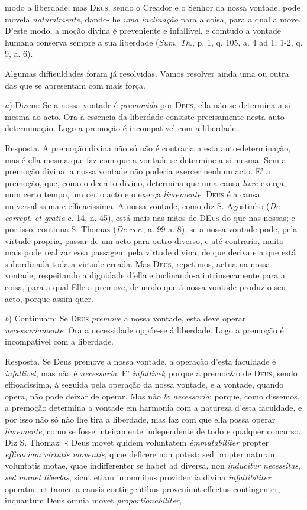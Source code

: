 modo a liberdade; mas \textsc{Deus}, sendo o Creador e o Senhor da nossa vontade, pode movela \emph{naturalmente}, dando-lhe \emph{uma inclinação} para a coisa, para a qual a move. D'este modo, a moção divina é preveniente e infallivel, e comtudo a vontade humana conserva sempre a sua liberdade (\emph{Sum}. \emph{Th}., p. 1, q. 105, a. 4 ad 1; 1-2, q. 9, a. 6).\par Algumas diffieuldades foram já resolvidas. Vamos resolver ainda uma ou outra das que se apresentam com mais força.\par \emph{a}) Dizem: Se a nossa vontade é \emph{premovida} por \textsc{Deus}, ella não se determina a si mesma ao acto. Ora a essencia da liberdade consiste precisamente nesta auto-determinação. Logo a premoção é incompativel com a liberdade.\par Resposta. A premoção divina não só não é contraria a esta auto-determinação, mas é ella mesma que faz com que a vontade se determine a si mesma. Sem a premoção divina, a nossa vontade não poderia exercer nenhum acto. E' a premoção, que, como o decreto divino, determina que uma causa \emph{livre} exerça, num certo tempo, um certo acto e o exerça \emph{livremente}. \textsc{Deus} é a causa universalissima e effieacissima. A nossa vontade, como diz S. Agostinho (\emph{De corrept}. \emph{et gratia} c. 14, n. 45), está mais nas mãos de \textsc{DEus} do que nas nossas; e por isso, continua S. Thomaz (\emph{De ver}., a. 99 a. 8), se a nossa vontade pode, pela virtude propria, passar de um acto para outro diverso, e até contrario, muito mais pode realizar essa passagem pela virtude divina, de que deriva e a que está subordinada toda a virtude creada. Mas \textsc{Deus}, repetimos, actua na nossa vontade, respeitando a dignidade d'ella e inclinando-a intrinsecamente para a coisa, para a qual Elle a premove, de modo que á nossa vontade produz o seu acto, porque assim quer.\par \emph{b}) Continuam: Se \textsc{Deus} \emph{premove} a nossa vontade, esta deve operar \emph{necessariamente}. Ora a necessidade oppóe-se á liberdade. Logo a premoção é incompativel com a liberdade.\par Resposta. Se Deus premove a nossa vontade, a operação d'esta faculdade é \emph{infallivel}, mas não é \emph{necessaria}. E' \emph{infallivel}; porque a premoc\&o de \textsc{Deus}, sendo effioacissima, á seguida pela operação da nossa vontade, e a vontade, quando opera, não pode deixar de operar. Mas não \& \emph{necessaria}; porque, como dissemos, a premoção determina a vontade em harmonia com a natureza d'esta faculdade, e por isso não só não lhe tira a liberdade, mas faz com que ella possa operar \emph{livremente}, como se fosse inteiramente independente de todo e qualquer concurso. Diz S. Thomaz: « Deus movet quidem voluntatem \emph{émmutabiliter} propter \emph{efficaciam virtutis moventis}, quae deficere non potest; sed propter naturam voluntatis motae, quae indifferenter se habet ad diversa, non \emph{inducitur necessitas}, \emph{sed manet liberlas}; sicut etiam in omnibus providentia divina \emph{infallibiliter} operatur; et tamen a causis contingentibus proveniunt effectus contingenter, inquantum Deus omnia movet \emph{proportionabiliter}, 